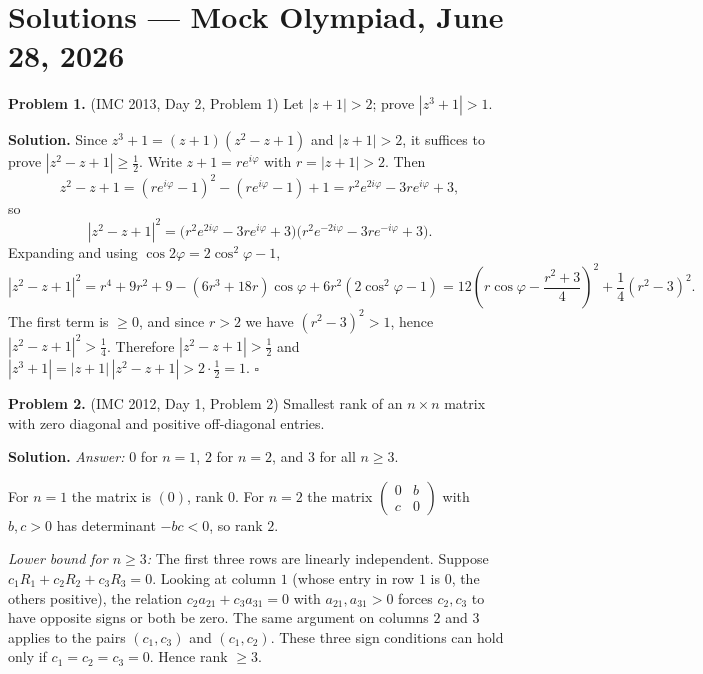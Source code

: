\documentclass{article}
\begin{document}
\pagestyle{plain}

\section*{Solutions --- Mock Olympiad, June 28, 2026}

\textbf{Problem 1.} (IMC 2013, Day 2, Problem 1)
Let \( |z + 1| > 2 \); prove \( |z^3 + 1| > 1 \).

\textbf{Solution.}
Since \( z^3 + 1 = (z+1)(z^2 - z + 1) \) and \( |z+1| > 2 \), it suffices to prove \( |z^2 - z + 1| \geq \tfrac{1}{2} \). Write \( z + 1 = r e^{i\varphi} \) with \( r = |z+1| > 2 \). Then
\[
z^2 - z + 1 = (re^{i\varphi} - 1)^2 - (re^{i\varphi} - 1) + 1 = r^2 e^{2i\varphi} - 3r e^{i\varphi} + 3,
\]
so
\[
|z^2 - z + 1|^2 = \bigl(r^2 e^{2i\varphi} - 3re^{i\varphi} + 3\bigr)\bigl(r^2 e^{-2i\varphi} - 3re^{-i\varphi} + 3\bigr).
\]
Expanding and using \( \cos 2\varphi = 2\cos^2\varphi - 1 \),
\[
|z^2 - z + 1|^2 = r^4 + 9r^2 + 9 - (6r^3 + 18r)\cos\varphi + 6r^2(2\cos^2\varphi - 1)
= 12\left( r\cos\varphi - \frac{r^2 + 3}{4} \right)^2 + \frac{1}{4}(r^2 - 3)^2.
\]
The first term is \( \geq 0 \), and since \( r > 2 \) we have \( (r^2 - 3)^2 > 1 \), hence \( |z^2 - z + 1|^2 > \tfrac{1}{4} \). Therefore \( |z^2 - z + 1| > \tfrac{1}{2} \) and \( |z^3 + 1| = |z+1|\,|z^2 - z + 1| > 2 \cdot \tfrac{1}{2} = 1 \). \hfill\(\square\)

\bigskip
\textbf{Problem 2.} (IMC 2012, Day 1, Problem 2)
Smallest rank of an \( n \times n \) matrix with zero diagonal and positive off-diagonal entries.

\textbf{Solution.} \emph{Answer:} \( 0 \) for \( n = 1 \), \( 2 \) for \( n = 2 \), and \( \boxed{3} \) for all \( n \geq 3 \).

For \( n = 1 \) the matrix is \( (0) \), rank \( 0 \). For \( n = 2 \) the matrix \( \begin{pmatrix} 0 & b \\ c & 0 \end{pmatrix} \) with \( b, c > 0 \) has determinant \( -bc < 0 \), so rank \( 2 \).

\emph{Lower bound for \( n \geq 3 \):} The first three rows are linearly independent. Suppose \( c_1 R_1 + c_2 R_2 + c_3 R_3 = 0 \). Looking at column \( 1 \) (whose entry in row \( 1 \) is \( 0 \), the others positive), the relation \( c_2 a_{21} + c_3 a_{31} = 0 \) with \( a_{21}, a_{31} > 0 \) forces \( c_2, c_3 \) to have opposite signs or both be zero. The same argument on columns \( 2 \) and \( 3 \) applies to the pairs \( (c_1, c_3) \) and \( (c_1, c_2) \). These three sign conditions can hold only if \( c_1 = c_2 = c_3 = 0 \). Hence rank \( \geq 3 \).
\end{document}
